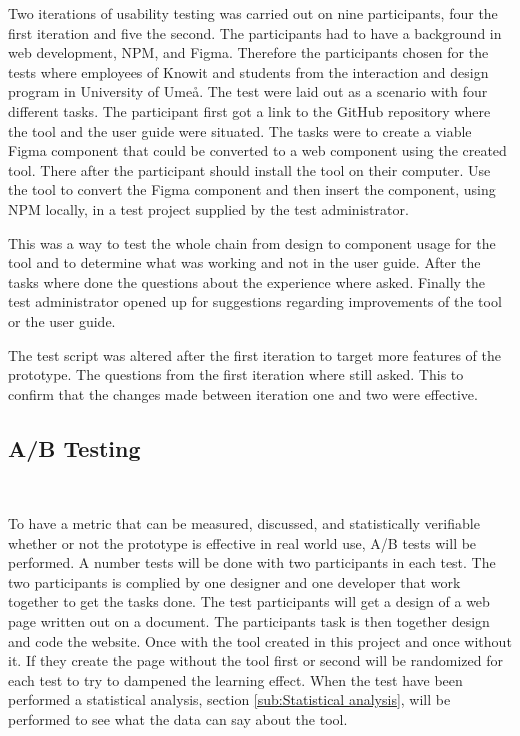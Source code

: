 Two iterations of usability testing was carried out on nine participants, four the first iteration and five the second. The participants had to have a background in web development, NPM, and Figma.  Therefore the participants chosen for the tests where employees of Knowit and students from the interaction and design program in University of Umeå. The test were laid out as a scenario with four different tasks. The participant first got a link to the GitHub repository where the tool and the user guide were situated. The tasks were to create a viable Figma component that could be converted to a web component using the created tool. There after the participant should install the tool on their computer. Use the tool to convert the Figma component and then insert the component, using NPM locally, in a test project supplied by the test administrator.

This was a way to test the whole chain from design to component usage for the tool and to determine what was working and not in the user guide. After the tasks where done the questions about the experience where asked. Finally the test administrator opened up for suggestions regarding improvements of the tool or the user guide. 

The test script was altered after the first iteration to target more features of the prototype. The questions from the first iteration where still asked. This to confirm that the changes made between iteration one and two were effective. 


\subsection{ A/B Testing }%
\label{sub:ab-testing}

\\

To have a metric that can be measured, discussed, and statistically verifiable whether or not the prototype is effective in real world use, A/B tests will be performed. A number tests will be done with two participants in each test. The two participants is complied by one designer and one developer that work together to get the tasks done. The test participants will get a design of a web page written out on a document. The participants task is then together design and code the website. Once with the tool created in this project and once without it. If they create the page without the tool first or second will be randomized for each test to try to dampened the learning effect. When the test have been performed a statistical analysis, section \ref{sub:Statistical analysis}, will be performed to see what the data can say about the tool.

